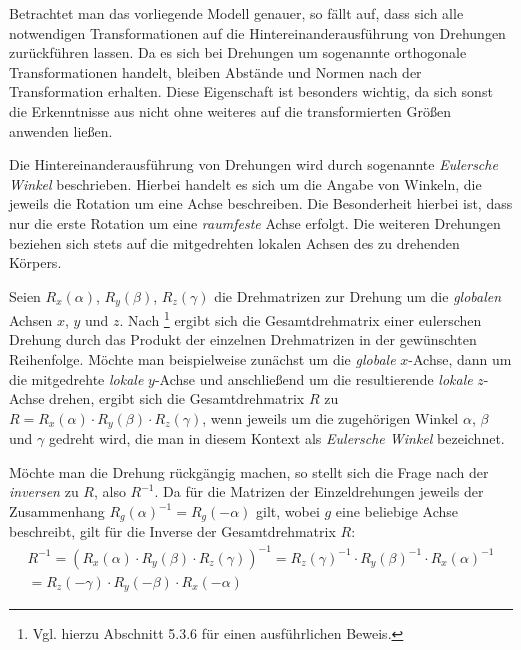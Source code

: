Betrachtet man das vorliegende Modell genauer, so f\"allt auf, dass sich alle notwendigen Transformationen auf die
Hintereinanderausf\"uhrung von Drehungen zur\"uckf\"uhren lassen. Da es sich bei Drehungen um sogenannte orthogonale Transformationen
handelt, bleiben Abst\"ande und Normen nach der Transformation erhalten. Diese Eigenschaft ist besonders wichtig, da sich sonst
die Erkenntnisse aus  nicht ohne weiteres auf die transformierten Gr\"o{\ss}en anwenden lie{\ss}en.

Die Hintereinanderausf\"uhrung von Drehungen wird durch sogenannte \textit{Eulersche Winkel} beschrieben. Hierbei handelt es sich
um die Angabe von Winkeln, die jeweils die Rotation um eine Achse beschreiben. Die Besonderheit hierbei ist, dass nur die erste
Rotation um eine \textit{raumfeste} Achse erfolgt. Die weiteren Drehungen beziehen sich stets auf die mitgedrehten lokalen Achsen des
zu drehenden K\"orpers.

Seien \(R_x(\alpha)\), \(R_y(\beta)\), \(R_z(\gamma)\) die Drehmatrizen zur Drehung um die \textit{globalen} Achsen \(x\), \(y\)
und \(z\). Nach \cite{Fis12}\footnote{Vgl. hierzu Abschnitt 5.3.6 f\"ur einen ausf\"uhrlichen Beweis.} ergibt sich die
Gesamtdrehmatrix einer eulerschen Drehung durch das Produkt der einzelnen Drehmatrizen
in der gew\"unschten Reihenfolge. M\"ochte man beispielweise zun\"achst um die \textit{globale} \(x\)-Achse, dann um die mitgedrehte
\textit{lokale} \(y\)-Achse und anschlie{\ss}end um die resultierende \textit{lokale} \(z\)-Achse drehen, ergibt sich die
Gesamtdrehmatrix \(R\) zu \(R = R_x(\alpha) \cdot R_y(\beta) \cdot R_z(\gamma)\), wenn jeweils um die zugeh\"origen Winkel
\(\alpha\), \(\beta\) und \(\gamma\) gedreht wird, die man in diesem Kontext als \textit{Eulersche Winkel} bezeichnet.

M\"ochte man die Drehung r\"uckg\"angig machen, so stellt sich die Frage nach der \textit{inversen} zu \(R\), also \(R^{-1}\).
Da f\"ur die Matrizen der Einzeldrehungen jeweils der Zusammenhang \(R_g(\alpha)^{-1} = R_g(-\alpha)\) gilt, wobei \(g\) eine beliebige
Achse beschreibt, gilt f\"ur die Inverse der Gesamtdrehmatrix \(R\):
\begin{equation}
  \label{eq:gesamtdrehung}
  \begin{split}
R^{-1} = \left(R_x(\alpha) \cdot R_y(\beta) \cdot R_z(\gamma)\right)^{-1} = R_z(\gamma)^{-1} \cdot R_y(\beta)^{-1} \cdot
R_x(\alpha)^{-1} \\
= R_z(-\gamma) \cdot R_y(-\beta) \cdot R_x(-\alpha)
  \end{split}
\end{equation}

